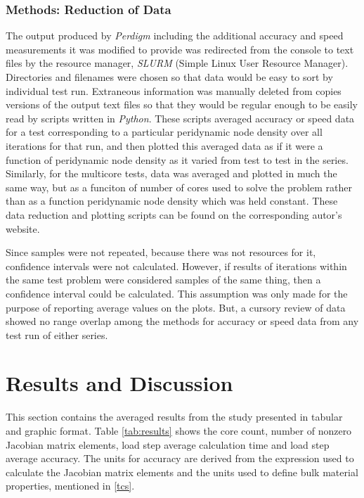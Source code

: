 \documentclass[preprint,12pt]{elsarticle}
\begin{document}
\subsubsection{Methods: Reduction of Data} The output produced by \emph{Perdigm} including the
additional accuracy and speed measurements it was modified to provide was redirected from the
console to text files by the resource manager, \emph{SLURM} (Simple Linux User Resource Manager).
Directories and filenames were chosen so that data would be easy to sort by individual test run.
Extraneous information was manually deleted from copies versions of the output text files so that
they would be regular enough to be easily read by scripts written in \emph{Python}. These scripts
averaged accuracy or speed data for a test corresponding to a particular peridynamic node density
over all iterations for that run, and then plotted this averaged data as if it were a function of
peridynamic node density as it varied from test to test in the series.  Similarly, for the multicore
tests, data was averaged and plotted in much the same way, but as a funciton of number of cores used
to solve the problem rather than as a function peridynamic node density which was held constant.
These data reduction and plotting scripts can be found on the corresponding autor's website.

Since samples were not repeated, because there was not resources for it, confidence intervals were
not calculated. However, if results of iterations within the same test problem were considered
samples of the same thing, then a confidence interval could be calculated. This assumption was only made
for the purpose of reporting average values on the plots. But, a cursory review of data showed no 
range overlap among the methods for accuracy or speed data from any test run of either series.

\section{Results and Discussion}

This section contains the averaged results from the study presented in tabular and graphic format.
Table \ref{tab:results} shows the core count, number of nonzero Jacobian matrix elements, load step
average calculation time and load step average accuracy. The units for accuracy are derived from the
expression used to calculate the Jacobian matrix elements and the units used to define bulk material
properties, mentioned in \ref{tcs}.
\end{document}
